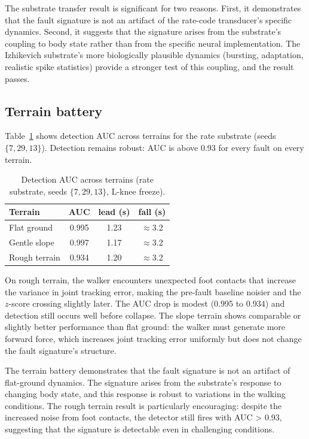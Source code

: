 The substrate transfer result is significant for two reasons. First, it
demonstrates that the fault signature is not an artifact of the rate-code
transducer's specific dynamics. Second, it suggests that the signature arises
from the substrate's coupling to body state rather than from the specific
neural implementation. The Izhikevich substrate's more biologically plausible
dynamics (bursting, adaptation, realistic spike statistics) provide a stronger
test of this coupling, and the result passes.

\subsection{Terrain battery}

Table~\ref{tab:terrain} shows detection AUC across terrains for the rate
substrate (seeds $\{7, 29, 13\}$). Detection remains robust: AUC is above
0.93 for every fault on every terrain.

\begin{table}[t]
\caption{Detection AUC across terrains (rate substrate, seeds
$\{7, 29, 13\}$, L-knee freeze).}
\label{tab:terrain}
\centering
\small
\renewcommand{\arraystretch}{1.15}
\begin{tabular}{@{}lccc@{}}
\toprule
Terrain & AUC & lead (s) & fall (s) \\
\midrule
Flat ground & 0.995 & 1.23 & $\approx$3.2 \\
Gentle slope & 0.997 & 1.17 & $\approx$3.2 \\
Rough terrain & 0.934 & 1.20 & $\approx$3.2 \\
\bottomrule
\end{tabular}
\end{table}

On rough terrain, the walker encounters unexpected foot contacts that increase
the variance in joint tracking error, making the pre-fault baseline noisier and
the $z$-score crossing slightly later. The AUC drop is modest (0.995 to 0.934)
and detection still occurs well before collapse. The slope terrain shows
comparable or slightly better performance than flat ground: the walker must
generate more forward force, which increases joint tracking error uniformly but
does not change the fault signature's structure.

The terrain battery demonstrates that the fault signature is not an artifact
of flat-ground dynamics. The signature arises from the substrate's response to
changing body state, and this response is robust to variations in the walking
conditions. The rough terrain result is particularly encouraging: despite the
increased noise from foot contacts, the detector still fires with AUC > 0.93,
suggesting that the signature is detectable even in challenging conditions.

